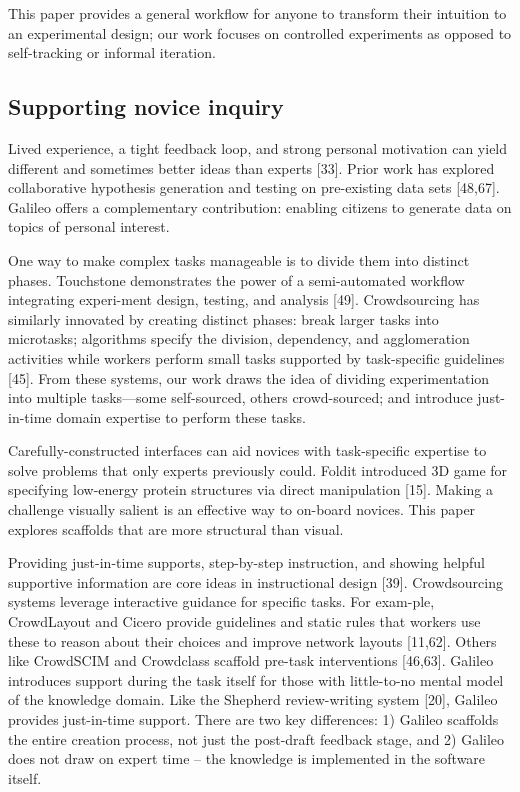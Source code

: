 This paper provides a general workflow for anyone to transform their intuition to an experimental design; our work focuses on controlled experiments as opposed to self-tracking or informal iteration.

\subsection{Supporting novice inquiry}
Lived experience, a tight feedback loop, and strong personal motivation can yield different and sometimes better ideas than experts [33]. Prior work has explored collaborative hypothesis generation and testing on pre-existing data sets [48,67]. Galileo offers a complementary contribution: enabling citizens to generate data on topics of personal interest.

One way to make complex tasks manageable is to divide them into distinct phases. Touchstone demonstrates the power of a semi-automated workflow integrating experi-ment design, testing, and analysis [49]. Crowdsourcing has similarly innovated by creating distinct phases: break larger tasks into microtasks; algorithms specify the division, dependency, and agglomeration activities while workers perform small tasks supported by task-specific guidelines [45]. From these systems, our work draws the idea of dividing experimentation into multiple tasks—some self-sourced, others crowd-sourced; and introduce just-in-time domain expertise to perform these tasks. 

Carefully-constructed interfaces can aid novices with task-specific expertise to solve problems that only experts previously could. Foldit introduced 3D game for specifying low-energy protein structures via direct manipulation [15]. Making a challenge visually salient is an effective way to on-board novices. This paper explores scaffolds that are more structural than visual.

Providing just-in-time supports, step-by-step instruction, and showing helpful supportive information are core ideas in instructional design [39]. Crowdsourcing systems leverage interactive guidance for specific tasks. For exam-ple, CrowdLayout and Cicero provide guidelines and static rules that workers use these to reason about their choices and improve network layouts [11,62]. Others like CrowdSCIM and Crowdclass scaffold pre-task interventions [46,63]. Galileo introduces support during the task itself for those with little-to-no mental model of the knowledge domain. Like the Shepherd review-writing system [20], Galileo provides just-in-time support. There are two key differences: 1) Galileo scaffolds the entire creation process, not just the post-draft feedback stage, and 2) Galileo does not draw on expert time – the knowledge is implemented in the software itself. 




